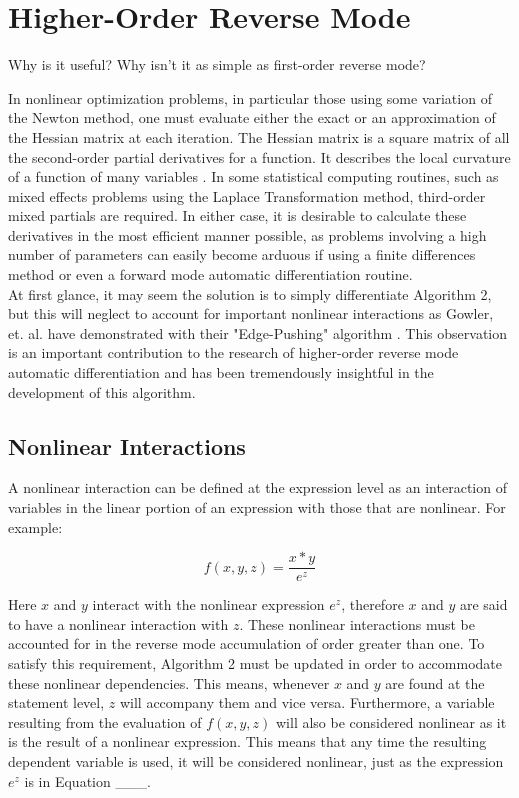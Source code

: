 \documentclass[oneside]{article}
\begin{document}
\section{Higher-Order Reverse Mode}

\begin{editnote}
Why is it useful?
Why isn't it as simple as first-order reverse mode?
\end{editnote}

In nonlinear optimization problems, in particular those using some variation of the Newton method, one must evaluate either the exact or an approximation of the Hessian matrix at each iteration. The Hessian matrix is a square matrix of all the second-order partial derivatives for a function. It describes the local curvature of a function of many variables \cite{wiki_hessian}. In some statistical computing routines, such as mixed effects problems using the Laplace Transformation method, third-order mixed partials are required. In either case, it is desirable to calculate these derivatives in the most efficient manner possible, as problems involving a high number of parameters can easily become arduous if using a finite differences method or even a forward mode automatic differentiation routine. \\
At first glance, it may seem the solution is to simply differentiate Algorithm 2, but this will neglect to account for important nonlinear interactions as Gowler, et. al. have demonstrated with their "Edge-Pushing" algorithm \cite{gowler_ep}. This observation is an important contribution to the research of higher-order reverse mode automatic differentiation and has been tremendously insightful in the development of this algorithm.


\subsection{Nonlinear Interactions}
A nonlinear interaction can be defined at the expression level as an interaction of variables in the linear portion of an expression with those that are nonlinear.  For example:

\begin{equation}
 f(x,y,z) = \frac{x*y}{e^z}
\end{equation}

Here $x$ and $y$ interact with the nonlinear expression $e^{z}$, therefore $x$ and $y$ are said to have a nonlinear interaction with $z$. These nonlinear interactions must be accounted for in the reverse mode accumulation of order greater than one. To satisfy this requirement, Algorithm 2 must be updated in order to accommodate these nonlinear dependencies. This means, whenever $x$ and $y$ are found at the statement level, $z$ will accompany them and vice versa. Furthermore, a variable resulting from the evaluation of $f(x,y,z)$ will also be considered nonlinear as it is the result of a nonlinear expression. This means that any time the resulting dependent variable is used, it will be considered nonlinear, just as the expression $e^{z}$ is in Equation ___.
\end{document}
